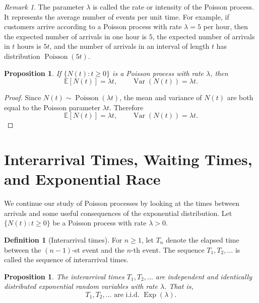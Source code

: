 \documentclass[11pt]{article}
\theoremstyle{plain}
\newtheorem{proposition}[theorem]{Proposition}
\theoremstyle{definition}
\newtheorem{definition}[theorem]{Definition}
\theoremstyle{remark}
\newtheorem{remark}[theorem]{Remark}
\begin{document}
\begin{remark}
	The parameter \(\lambda\) is called the rate or intensity of the Poisson process. It represents the average number of events per unit time. For example, if customers arrive according to a Poisson process with rate \(\lambda=5\) per hour, then the expected number of arrivals in one hour is \(5\), the expected number of arrivals in \(t\) hours is \(5t\), and the number of arrivals in an interval of length \(t\) has distribution \(\operatorname{Poisson}(5t)\).
\end{remark}

\begin{proposition}
	If \(\{N(t):t\ge 0\}\) is a Poisson process with rate \(\lambda\), then
	\[
	\mathbb{E}[N(t)]=\lambda t,
	\qquad
	\operatorname{Var}(N(t))=\lambda t.
	\]
\end{proposition}

\begin{proof}
	Since \(N(t)\sim \operatorname{Poisson}(\lambda t)\), the mean and variance of \(N(t)\) are both equal to the Poisson parameter \(\lambda t\). Therefore
	\[
	\mathbb{E}[N(t)]=\lambda t,
	\qquad
	\operatorname{Var}(N(t))=\lambda t.
	\]
\end{proof}

	
	
	
	\section{Interarrival Times, Waiting Times, and Exponential Race}
	
	We continue our study of Poisson processes by looking at the times between arrivals and some useful consequences of the exponential distribution. Let \(\{N(t):t\ge 0\}\) be a Poisson process with rate \(\lambda>0\).
	
	\begin{definition}[Interarrival times]
		For \(n\ge 1\), let \(T_n\) denote the elapsed time between the \((n-1)\)-st event and the \(n\)-th event. The sequence \(T_1,T_2,\dots\) is called the sequence of interarrival times.
	\end{definition}
	
	\begin{proposition}
		The interarrival times \(T_1,T_2,\dots\) are independent and identically distributed exponential random variables with rate \(\lambda\). That is,
		\[
		T_1,T_2,\dots \text{ are i.i.d. } \operatorname{Exp}(\lambda).
		\]
	\end{proposition}
	
\end{document}
